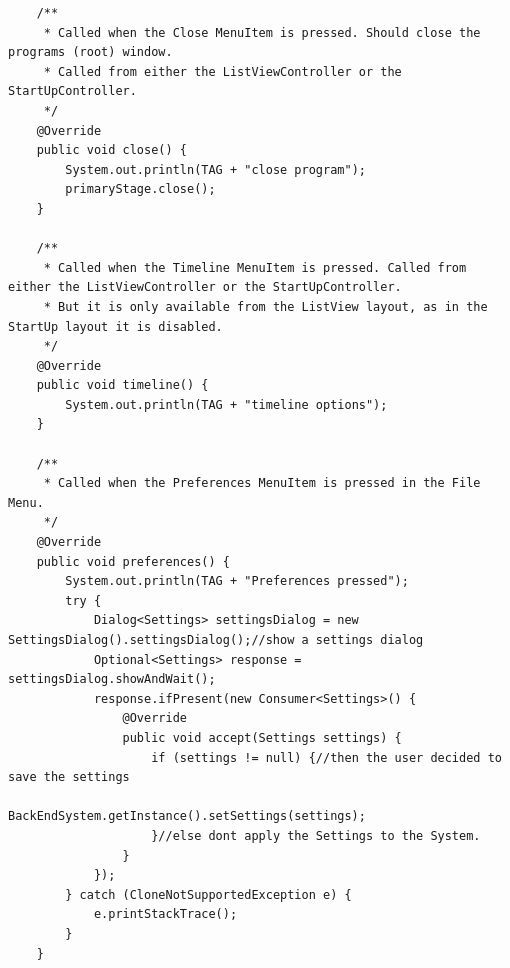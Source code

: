 \begin{lstlisting}
    /**
     * Called when the Close MenuItem is pressed. Should close the programs (root) window.
     * Called from either the ListViewController or the StartUpController.
     */
    @Override
    public void close() {
        System.out.println(TAG + "close program");
        primaryStage.close();
    }

    /**
     * Called when the Timeline MenuItem is pressed. Called from either the ListViewController or the StartUpController.
     * But it is only available from the ListView layout, as in the StartUp layout it is disabled.
     */
    @Override
    public void timeline() {
        System.out.println(TAG + "timeline options");
    }

    /**
     * Called when the Preferences MenuItem is pressed in the File Menu.
     */
    @Override
    public void preferences() {
        System.out.println(TAG + "Preferences pressed");
        try {
            Dialog<Settings> settingsDialog = new SettingsDialog().settingsDialog();//show a settings dialog
            Optional<Settings> response = settingsDialog.showAndWait();
            response.ifPresent(new Consumer<Settings>() {
                @Override
                public void accept(Settings settings) {
                    if (settings != null) {//then the user decided to save the settings
                        BackEndSystem.getInstance().setSettings(settings);
                    }//else dont apply the Settings to the System.
                }
            });
        } catch (CloneNotSupportedException e) {
            e.printStackTrace();
        }
    }


\end{lstlisting}
